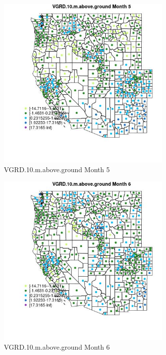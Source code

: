 \begin{figure} 
\centering  
\includegraphics[width=0.77\textwidth]{Code_Outputs/df_report_ML_predictors_CountyCentroid_Locations_Dates_2008-01-01to2018-12-31_MapObsMo5VGRD10maboveground.jpg} 
\caption{\label{fig:df_report_ML_predictors_CountyCentroid_Locations_Dates_2008-01-01to2018-12-31MapObsMo5VGRD10maboveground}VGRD.10.m.above.ground Month 5} 
\end{figure} 
 

\begin{figure} 
\centering  
\includegraphics[width=0.77\textwidth]{Code_Outputs/df_report_ML_predictors_CountyCentroid_Locations_Dates_2008-01-01to2018-12-31_MapObsMo6VGRD10maboveground.jpg} 
\caption{\label{fig:df_report_ML_predictors_CountyCentroid_Locations_Dates_2008-01-01to2018-12-31MapObsMo6VGRD10maboveground}VGRD.10.m.above.ground Month 6} 
\end{figure} 
 

